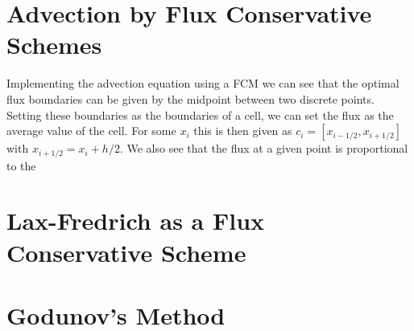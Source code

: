 \section{Advection by Flux Conservative Schemes}
Implementing the advection equation using a FCM we can see that the optimal flux boundaries can be given by the midpoint between two discrete points. Setting these boundaries as the boundaries of a cell, we can set the flux as the average value of the cell. For some $x_i$ this is then given as $c_i=[x_{i-1/2},x_{i+1/2}]$ with $x_{i+1/2} = x_i + h/2$. We also see that the flux at a given point is proportional to the 
\section{Lax-Fredrich as a Flux Conservative Scheme}
\section{Godunov's Method}